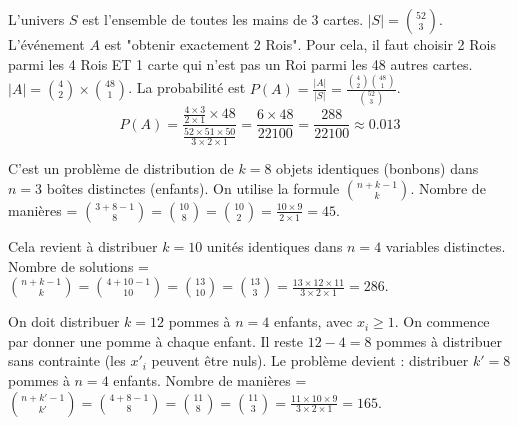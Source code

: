\begin{correctionbox}
L'univers $S$ est l'ensemble de toutes les mains de 3 cartes. $|S| = \binom{52}{3}$.
L'événement $A$ est "obtenir exactement 2 Rois". Pour cela, il faut choisir 2 Rois parmi les 4 Rois ET 1 carte qui n'est pas un Roi parmi les 48 autres cartes.
$|A| = \binom{4}{2} \times \binom{48}{1}$.
La probabilité est $P(A) = \frac{|A|}{|S|} = \frac{\binom{4}{2} \binom{48}{1}}{\binom{52}{3}}$.
$$ P(A) = \frac{\frac{4 \times 3}{2 \times 1} \times 48}{\frac{52 \times 51 \times 50}{3 \times 2 \times 1}} = \frac{6 \times 48}{22100} = \frac{288}{22100} \approx 0.013 $$
\end{correctionbox}


\begin{correctionbox}
C'est un problème de distribution de $k=8$ objets identiques (bonbons) dans $n=3$ boîtes distinctes (enfants). On utilise la formule $\binom{n+k-1}{k}$.
Nombre de manières = $\binom{3+8-1}{8} = \binom{10}{8} = \binom{10}{2} = \frac{10 \times 9}{2 \times 1} = 45$.
\end{correctionbox}

\begin{correctionbox}
Cela revient à distribuer $k=10$ unités identiques dans $n=4$ variables distinctes.
Nombre de solutions = $\binom{n+k-1}{k} = \binom{4+10-1}{10} = \binom{13}{10} = \binom{13}{3} = \frac{13 \times 12 \times 11}{3 \times 2 \times 1} = 286$.
\end{correctionbox}

\begin{correctionbox}
On doit distribuer $k=12$ pommes à $n=4$ enfants, avec $x_i \ge 1$.
On commence par donner une pomme à chaque enfant. Il reste $12 - 4 = 8$ pommes à distribuer sans contrainte (les $x'_i$ peuvent être nuls).
Le problème devient : distribuer $k'=8$ pommes à $n=4$ enfants.
Nombre de manières = $\binom{n+k'-1}{k'} = \binom{4+8-1}{8} = \binom{11}{8} = \binom{11}{3} = \frac{11 \times 10 \times 9}{3 \times 2 \times 1} = 165$.
\end{correctionbox}


